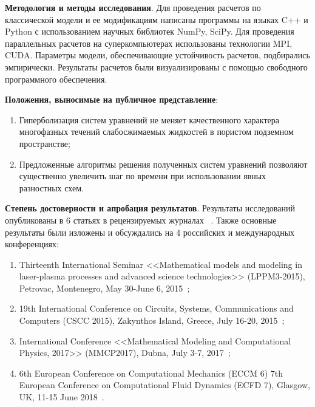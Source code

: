 \textbf{Методология и методы исследования}. Для проведения расчетов по классической модели и ее модификациям написаны программы на языках C++ и Python с использованием научных библиотек NumPy, SciPy. Для проведения параллельных расчетов на суперкомпьютерах использованы технологии MPI, CUDA.
Параметры модели, обеспечивающие устойчивость расчетов, подбирались эмпирически.
Результаты расчетов были визуализированы с помощью свободного программного обеспечения.

\textbf{Положения, выносимые на публичное представление}:
\begin{enumerate}
 \item Гиперболизация систем уравнений не меняет качественного характера многофазных течений слабосжимаемых жидкостей в пористом подземном
пространстве;
 \item Предложенные алгоритмы решения полученных систем уравнений позволяют существенно увеличить шаг по времени при использовании явных разностных схем.
\end{enumerate}

\textbf{Степень достоверности и апробация результатов}. Результаты исследований опубликованы в 6 статьях в рецензируемых журналах
~\citeauthor{matmod2014, matmod2015, preprint12016, preprint22016, preprint12018, preprint22018}. Также основные результаты были изложены и обсуждались на 4 российских и международных конференциях:
\begin{enumerate}
 \item Thirteenth International Seminar <<Mathematical models and modeling in laser-plasma processes and advanced science technologies>> (LPPM3-2015), Petrovac, Montenegro, May 30-June 6, 2015~\citeauthor{proc13th};
 \item 19th International Conference on Circuits, Systems, Communications and Computers (CSCC 2015), Zakynthos Island, Greece, July 16-20, 2015~\citeauthor{proc19th};
 \item International Conference <<Mathematical Modeling and Computational Physics, 2017>> (MMCP2017), Dubna, July 3-7, 2017~\citeauthor{proc2017};
 \item 6th European Conference on Computational Mechanics (ECCM 6) 7th European Conference on Computational Fluid Dynamics (ECFD 7), Glasgow, UK, 11-15 June 2018~\citeauthor{proc2018}.
\end{enumerate}
 
